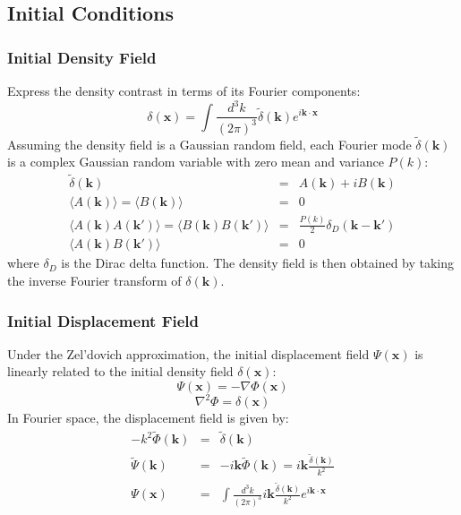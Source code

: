 \subsection{Initial Conditions}
\subsubsection{Initial Density Field}
Express the density contrast in terms of its Fourier components:
\begin{equation}
    \delta(\mathbf{x}) = \int \frac{d^3k}{(2\pi)^3} \tilde{\delta}(\mathbf{k}) e^{i\mathbf{k} \cdot \mathbf{x}}
\end{equation}
Assuming the density field is a Gaussian random field, each Fourier mode $\tilde{\delta}(\mathbf{k})$ is a complex Gaussian random variable with zero mean and variance $P(k)$:
\begin{eqnarray}
    \tilde{\delta}(\mathbf{k}) &=& A(\mathbf{k}) + iB(\mathbf{k}) \\
    \langle A(\mathbf{k}) \rangle = \langle B(\mathbf{k}) \rangle &=& 0 \\
    \langle A(\mathbf{k}) A(\mathbf{k'}) \rangle = \langle B(\mathbf{k}) B(\mathbf{k'}) \rangle &=& \frac{P(k)}{2} \delta_D(\mathbf{k} - \mathbf{k'}) \\
    \langle A(\mathbf{k}) B(\mathbf{k'}) \rangle &=& 0
\end{eqnarray}
where $\delta_D$ is the Dirac delta function. The density field is then obtained by taking the inverse Fourier transform of $\delta(\mathbf{k})$.
\subsubsection{Initial Displacement Field}
Under the Zel'dovich approximation, the initial displacement field $\Psi(\mathbf{x})$ is linearly related to the initial density field $\delta(\mathbf{x})$:
\begin{equation}
    \Psi(\mathbf{x}) = - \nabla \Phi(\mathbf{x}) 
\end{equation}
\begin{equation}
    \nabla^2 \Phi = \delta(\mathbf{x})
\end{equation}
In Fourier space, the displacement field is given by:
\begin{eqnarray}
    - k^2 \tilde{\Phi}(\mathbf{k}) &=& \tilde{\delta}(\mathbf{k}) \nonumber \\
    \tilde{\Psi}(\mathbf{k}) &=& -i\mathbf{k} \tilde{\Phi}(\mathbf{k}) = i\mathbf{k} \frac{\tilde{\delta}(\mathbf{k})}{k^2} \nonumber \\
    \Psi(\mathbf{x}) &=& \int \frac{d^3k}{(2\pi)^3} i\mathbf{k} \frac{\tilde{\delta}(\mathbf{k})}{k^2} e^{i\mathbf{k} \cdot \mathbf{x}}
\end{eqnarray}

